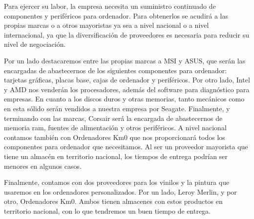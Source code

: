 Para ejercer su labor, la empresa necesita un suministro continuado de componentes y periféricos para ordenador. Para obtenerlos se acudirá a las propias marcas o a otros mayoristas ya sea a nivel nacional o a nivel internacional, ya que la diversificación de proveedores es necesaria para reducir su nivel de negociación.

Por un lado destacaremos entre las propias marcas a MSI y ASUS, que serán las encargadas de abastecernos de los siguientes componentes para ordenador: tarjetas gráficas, placas base, cajas de ordenador y periféricos. Por otro lado, Intel y AMD nos venderán los procesadores, además del software para diagnóstico para empresas. En cuanto a los discos duros y otras memorias, tanto mecánicos como en esta sólido serán vendidos a nuestra empresa por Seagate. Finalmente, y terminando con las marcas, Corsair será la encargada de abastecernos de memoria ram, fuentes de alimentación y otros periféricos. A nivel nacional contamos también con Ordenadores Km0 que nos proporcionará todos los componentes para ordenador que necesitamos. Al ser un proveedor mayorista que tiene un almacén en territorio nacional, los tiempos de entrega podrían ser menores en algunos casos.

Finalmente, contamos con dos proveedores para los vinilos y la pintura que usaremos en los ordenadores personalizados. Por un lado, Leroy Merlin, y por otro, Ordenadores Km0. Ambos tienen almacenes con estos productos en territorio nacional, con lo que tendremos un buen tiempo de entrega.